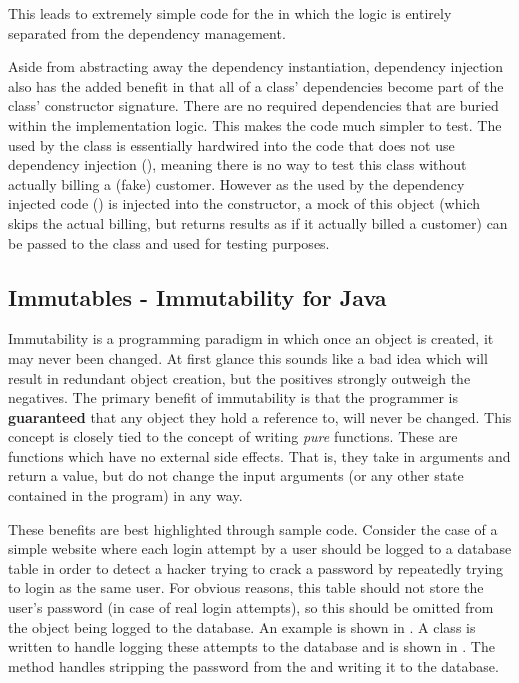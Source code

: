 This leads to extremely simple code for the  in which the logic is entirely separated from the dependency management.



Aside from abstracting away the dependency instantiation, dependency injection also has the added benefit in that all of a class' dependencies become part of the class' constructor signature. There are no required dependencies that are buried within the implementation logic. This makes the code much simpler to test. The  used by the class is essentially hardwired into the code that does not use dependency injection (), meaning there is no way to test this class without actually billing a (fake) customer. However as the  used by the dependency injected code () is injected into the constructor, a mock of this object (which skips the actual billing, but returns results as if it actually billed a customer) can be passed to the class and used for testing purposes.   

\subsection{Immutables - Immutability for Java}
Immutability is a programming paradigm in which once an object is created, it may never been changed. At first glance this sounds like a bad idea which will result in redundant object creation, but the positives strongly outweigh the negatives. The primary benefit of immutability is that the programmer is \textbf{guaranteed} that any object they hold a reference to, will never be changed. This concept is closely tied to the concept of writing \textit{pure} functions. These are functions which have no external side effects. That is, they take in arguments and return a value, but do not change the input arguments (or any other state contained in the program) in any way. 

These benefits are best highlighted through sample code. Consider the case of a simple website where each login attempt by a user should be logged to a database table in order to detect a hacker trying to crack a password by repeatedly trying to login as the same user. For obvious reasons, this table should not store the user's password (in case of real login attempts), so this should be omitted from the object being logged to the database. An example  is shown in . A  class is written to handle logging these attempts to the database and is shown in . The  method handles stripping the password from the  and writing it to the database. 

